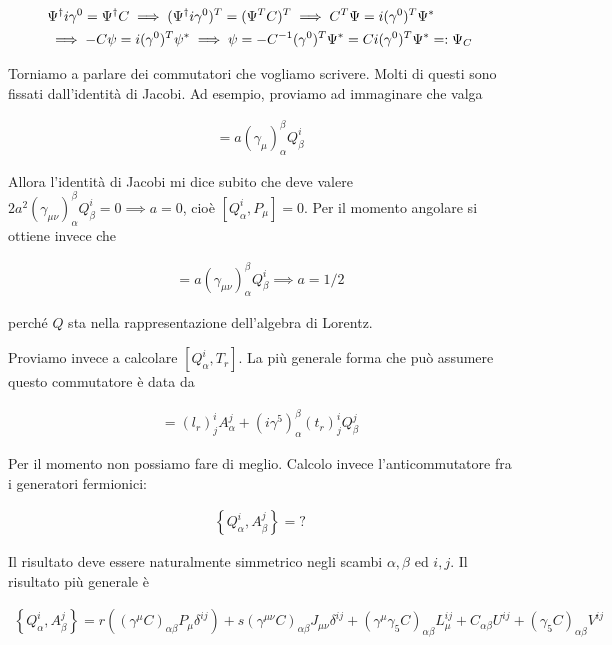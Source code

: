 \documentclass{report}
\begin{document}
\begin{align}
    &\Psi^\dagger i \gamma^0 = \Psi^\dagger C \implies (\Psi^\dagger i \gamma^0)^T = (\Psi^T C)^T \implies C^T \Psi = i(\gamma^0)^T \Psi^* \notag \\ 
    &\implies -C\psi = i(\gamma^0)^T \psi^* \implies \psi = -C^{-1}(\gamma^0)^T \Psi^* = C i (\gamma^0)^T \Psi^* =:\Psi_C
\end{align}

Torniamo a parlare dei commutatori che vogliamo scrivere. Molti di questi sono fissati dall'identità di Jacobi. Ad esempio, proviamo ad immaginare che valga 

\begin{align}
    [Q_\alpha^i, P_\mu] = a (\gamma_\mu)^\beta_\alpha Q^i_\beta
\end{align}

Allora l'identità di Jacobi mi dice subito che deve valere \(2a^2(\gamma_{\mu\nu})_\alpha^\beta Q_\beta^i = 0 \implies a = 0\), cioè \([Q_\alpha^i, P_\mu] = 0\). 
Per il momento angolare si ottiene invece che 

\begin{align}
    [Q_\alpha^i, J_{\mu\nu}] = a(\gamma_{\mu\nu})^\beta_\alpha Q_\beta^i \implies a = 1/2
\end{align}

perché \(Q\) sta nella rappresentazione dell'algebra di Lorentz. 

Proviamo invece a calcolare \([Q_\alpha^i, T_r]\). La più generale forma che può assumere questo commutatore è data da 

\begin{align}
    [Q_\alpha^i, T_r] = (l_r)^i_j A_\alpha^j + (i\gamma^5)^\beta_\alpha (t_r)^i_j Q_\beta^j
\end{align}

Per il momento non possiamo fare di meglio. Calcolo invece l'anticommutatore fra i generatori fermionici: 

\begin{align}
    \left\{Q_\alpha^i, A_\beta^j\right\} = ? 
\end{align}

Il risultato deve essere naturalmente simmetrico negli scambi \(\alpha, \beta\) ed \(i, j\). Il risultato più generale è 

\begin{align}
    \left\{Q_\alpha^i, A_\beta^j\right\} = r((\gamma^\mu C)_{\alpha\beta}P_\mu \delta^{ij}) + s(\gamma^{\mu\nu}C)_{\alpha\beta}J_{\mu\nu}\delta^{ij} + (\gamma^\mu \gamma_5 C)_{\alpha\beta}L^{ij}_\mu + C_{\alpha\beta}U^{ij} + (\gamma_5 C)_{\alpha\beta}V^{ij}
\end{align}
\end{document}
